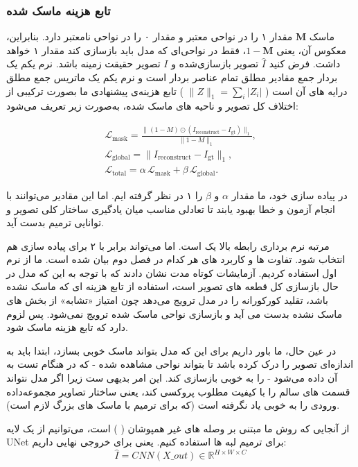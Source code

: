 \subsubsection{تابع هزینه  ماسک شده}

ماسک $\mathbf{M}$ مقدار ۱ را در نواحی معتبر و مقدار ۰ را در نواحی نامعتبر دارد. بنابراین، معکوس آن، یعنی $1 - \mathbf{M}$، فقط در نواحی‌ای که مدل باید بازسازی کند مقدار ۱ خواهد داشت. فرض کنید $\hat{I}$ تصویر بازسازی‌شده و $I$ تصویر حقیقت زمینه باشد. نرم یکم یک بردار جمع مقادیر مطلق تمام عناصر بردار است و نرم یکم یک ماتریس جمع مطلق درایه های آن است (
$\|Z\|_1​=\sum_i{|Z_i|}$
)  تابع هزینه‌ی پیشنهادی ما بصورت ترکیبی از اختلاف کل تصویر و ناحیه های ماسک شده، به‌صورت زیر تعریف می‌شود:

\begin{gather}
	\mathcal{L}_\text{mask} = \frac{ \| (1-M) \odot (I_\text{reconstruct} - I_\text{gt}) \|_1 }{ \| 1-M \|_1}, \\
	\mathcal{L}_\text{global} = \| I_\text{reconstruct} - I_\text{gt} \|_1, \\
	\mathcal{L}_\text{total} = \alpha\, \mathcal{L}_\text{mask} + \beta\, \mathcal{L}_\text{global}.
\end{gather}

در پیاده سازی خود، ما مقدار $\alpha$ و $\beta$ را ۱ در نظر گرفته ایم. اما  این مقادیر می‌توانند با انجام آزمون و خطا بهبود یابند تا تعادلی مناسب میان یادگیری ساختار کلی تصویر و توانایی ترمیم بدست آید.

مرتبه نرم برداری رابطه بالا یک است. اما می‌تواند برابر با ۲ برای پیاده سازی  هم انتخاب شود. تفاوت ها و کاربرد های هر کدام در فصل دوم بیان شده است. ما از نرم اول استفاده کردیم. آزمایشات کوتاه مدت نشان دادند که با توجه به این که مدل در حال بازسازی کل قطعه های تصویر است،‌ استفاده از تابع هزینه ای که ماسک نشده باشد، تقلید کورکورانه را در مدل ترویج می‌دهد چون امتیاز «تشابه» از بخش های ماسک نشده بدست می آید و بازسازی نواحی ماسک شده ترویج نمی‌شود. پس لزوم دارد که تابع هزینه ماسک شود.

در عین حال، ما باور داریم برای این که مدل بتواند ماسک خوبی بسازد، ابتدا باید به اندازه‌ای تصویر را درک کرده باشد تا بتواند نواحی مشاهده شده - که در هنگام تست به آن داده می‌شود - را به خوبی بازسازی کند. این امر بدیهی ست زیرا اگر مدل نتواند قسمت های سالم را با کیفیت مطلوب پروکسی کند، یعنی ساختار تصاویر مجموعه‌داده ورودی را به خوبی یاد نگرفته است (که برای ترمیم با ماسک های بزرگ لازم است).

از آنجایی که روش ما مبتنی بر وصله های غیر همپوشان (
) است، می‌توانیم از یک لایه UNet برای ترمیم لبه ها استفاده کنیم. یعنی  برای خروجی نهایی داریم:
\begin{equation}
	\hat{I} = CNN(X\_{out}) \in \mathbb{R}^{H \times W \times C}
\end{equation}

